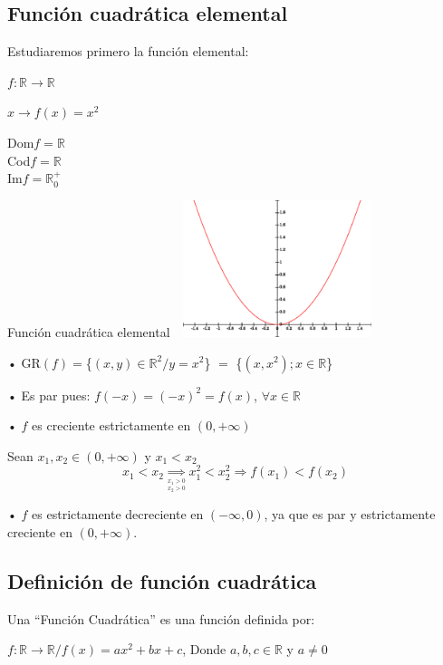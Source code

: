 \subsection{Función cuadrática elemental}
\hfill
\begin{minipage}{.45\textwidth}
Estudiaremos primero la función elemental:\\
\begin{center}
$f:\mathbb{R} \longrightarrow \mathbb{R}$

$x \longrightarrow f(x)=x^{2}$
\end{center}
Dom$f = \mathbb{R}$\\
Cod$f = \mathbb{R}$\\
Im$f = \mathbb{R} ^{+} _{0}$\\
\end{minipage}
\hfill
\begin{minipage}{.45\textwidth}
\begin{center}
Función cuadrática elemental
\includegraphics[height=4cm,width=6cm]{fcxx.eps} 
\end{center} 
\end{minipage}
\hfill

• GR$(f)=$\{$(x,y) \in \mathbb{R}^{2} / y= x^{2}$\} $=$ \{$(x,x^{2}); x \in \mathbb{R}$\}

• Es par pues: $f(-x)=(-x)^{2}=f(x)$, $\forall x \in \mathbb{R}$

• $f$ es creciente estrictamente en $(0,+\infty)$

Sean $x_{1},x_{2} \in (0,+\infty)$ y $x_{1} < x_{2}$\\

$$x_{1} < x_{2} \underset{\stackrel{x_{1}>0}{\stackrel{x_{2}>0}{}}}{\Rightarrow}x_{1}^{2}<x_{2}^{2} \Rightarrow f(x_{1})<f(x_{2})$$

• $f$ es estrictamente decreciente en $(-\infty,0)$, ya que es par y estrictamente creciente en $(0,+\infty)$.

\subsection{Definición de función cuadrática}
 Una ``Función Cuadrática'' es una función definida por:
 \begin{center}
 $f: \mathbb{R} \longrightarrow \mathbb{R} / f(x)= ax^{2}+bx+c$, Donde $a,b,c \in \mathbb{R}$ y $a \neq 0$ 
 \end{center}

